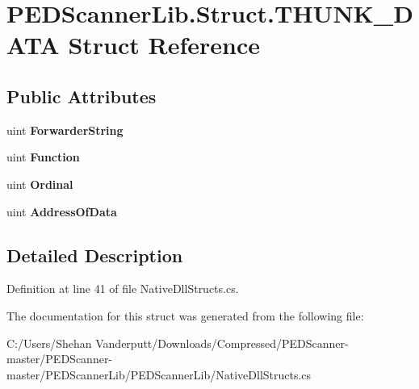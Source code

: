 \hypertarget{struct_p_e_d_scanner_lib_1_1_struct_1_1_t_h_u_n_k___d_a_t_a}{}\section{P\+E\+D\+Scanner\+Lib.\+Struct.\+T\+H\+U\+N\+K\+\_\+\+D\+A\+TA Struct Reference}
\label{struct_p_e_d_scanner_lib_1_1_struct_1_1_t_h_u_n_k___d_a_t_a}
\subsection*{Public Attributes}
\begin{DoxyCompactItemize}
\item 
\mbox{\label{struct_p_e_d_scanner_lib_1_1_struct_1_1_t_h_u_n_k___d_a_t_a_a603fddd7cf2ea8228fc9720cb0a93f3c}} 
uint {\bfseries Forwarder\+String}
\item 
\mbox{\label{struct_p_e_d_scanner_lib_1_1_struct_1_1_t_h_u_n_k___d_a_t_a_ab1d4d3a3112911e2bdcab42e382a2017}} 
uint {\bfseries Function}
\item 
\mbox{\label{struct_p_e_d_scanner_lib_1_1_struct_1_1_t_h_u_n_k___d_a_t_a_a99b94868eb1a8ca0642ffe7c47d66298}} 
uint {\bfseries Ordinal}
\item 
\mbox{\label{struct_p_e_d_scanner_lib_1_1_struct_1_1_t_h_u_n_k___d_a_t_a_a81bb1d4b9aca3be04cf162e1de6c47ae}} 
uint {\bfseries Address\+Of\+Data}
\end{DoxyCompactItemize}


\subsection{Detailed Description}


Definition at line 41 of file Native\+Dll\+Structs.\+cs.



The documentation for this struct was generated from the following file\+:\begin{DoxyCompactItemize}
\item 
C\+:/\+Users/\+Shehan Vanderputt/\+Downloads/\+Compressed/\+P\+E\+D\+Scanner-\/master/\+P\+E\+D\+Scanner-\/master/\+P\+E\+D\+Scanner\+Lib/\+P\+E\+D\+Scanner\+Lib/Native\+Dll\+Structs.\+cs\end{DoxyCompactItemize}
